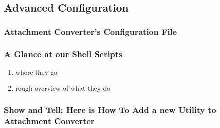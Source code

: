 \documentclass[11pt]{article}
\begin{document}
\subsection{Advanced Configuration}
\label{sec:org3ae48d3}

\subsubsection{Attachment Converter's Configuration File}
\label{sec:org4f30ae8}

\subsubsection{A Glance at our Shell Scripts}
\label{sec:org4d26ccc}

\begin{enumerate}
\item where they go
\label{sec:org1560f7d}

\item rough overview of what they do
\label{sec:org3169d46}
\end{enumerate}

\subsubsection{Show and Tell: Here is How To Add a new Utility to Attachment Converter}
\label{sec:org14d39cf}
\end{document}
